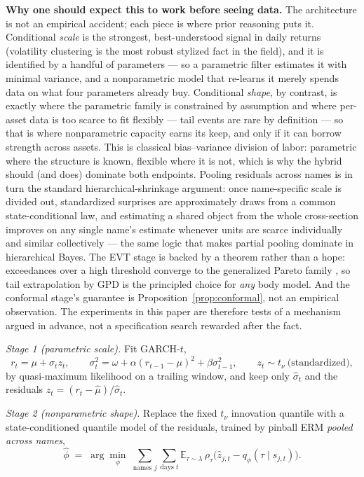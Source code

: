 \documentclass[11pt]{article}
\theoremstyle{remark}
\begin{document}
\noindent\textbf{Why one should expect this to work before seeing
data.} The architecture is not an empirical accident; each piece is
where prior reasoning puts it. Conditional \emph{scale} is the
strongest, best-understood signal in daily returns (volatility
clustering is the most robust stylized fact in the field), and it is
identified by a handful of parameters --- so a parametric filter
estimates it with minimal variance, and a nonparametric model that
re-learns it merely spends data on what four parameters already buy.
Conditional \emph{shape}, by contrast, is exactly where the parametric
family is constrained by assumption and where per-asset data is too
scarce to fit flexibly --- tail events are rare by definition --- so
that is where nonparametric capacity earns its keep, and only if it can
borrow strength across assets. This is classical bias--variance
division of labor: parametric where the structure is known, flexible
where it is not, which is why the hybrid should (and does) dominate
both endpoints. Pooling residuals across names is in turn the standard
hierarchical-shrinkage argument: once name-specific scale is divided
out, standardized surprises are approximately draws from a common
state-conditional law, and estimating a shared object from the whole
cross-section improves on any single name's estimate whenever units are
scarce individually and similar collectively --- the same logic that
makes partial pooling dominate in hierarchical Bayes. The EVT stage is
backed by a theorem rather than a hope: exceedances over a high
threshold converge to the generalized Pareto family
\citep{balkema1974, pickands1975}, so tail extrapolation by GPD is the
principled choice for \emph{any} body model. And the conformal stage's
guarantee is Proposition~\ref{prop:conformal}, not an empirical
observation. The experiments in this paper are therefore tests of a
mechanism argued in advance, not a specification search rewarded after
the fact.

\emph{Stage 1 (parametric scale).} Fit GARCH-$t$,
\begin{equation}
r_t = \mu + \sigma_t z_t,\qquad
\sigma_t^2 = \omega + \alpha (r_{t-1}-\mu)^2 + \beta \sigma_{t-1}^2,
\qquad z_t \sim t_\nu \ \text{(standardized)},
\label{eq:garch}
\end{equation}
by quasi-maximum likelihood on a trailing window, and keep only
$\widehat{\sigma}_t$ and the residuals
$\widehat{z}_t = (r_t-\widehat{\mu})/\widehat{\sigma}_t$.

\emph{Stage 2 (nonparametric shape).} Replace the fixed $t_\nu$
innovation quantile with a state-conditioned quantile model of the
residuals, trained by pinball ERM \emph{pooled across names},
\begin{equation}
\widehat{\phi} \;=\; \arg\min_{\phi}\;
\sum_{\text{names } j}\sum_{\text{days } t}
\mathbb{E}_{\tau\sim\lambda}\,
\rho_\tau\!\big(\widehat{z}_{j,t} - q_\phi(\tau \mid s_{j,t})\big).
\label{eq:shapeERM}
\end{equation}
\end{document}
